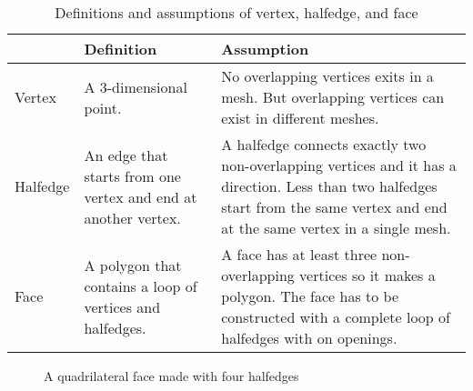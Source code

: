 \documentclass[12pt]{article}
\begin{document}
\begin{table}[ht]
\centering
\begin{tabular}{| l | p{} | p{}|}

\hline
		&	Definition	& Assumption	\\
\hline
Vertex	&	A 3-dimensional point.		&	No overlapping vertices 
exits in a mesh. But overlapping vertices can exist in different meshes.\\
\hline
Halfedge	&	An edge that starts from one vertex and end at another vertex. & 
A halfedge connects exactly two non-overlapping vertices and it has a direction. 
Less than two halfedges start from the same vertex and end at the same vertex in a 
single mesh.\\
\hline
Face		&	A polygon that contains a loop of vertices and halfedges.	& A face has at 
least three non-overlapping vertices so it makes a polygon. The face has to be constructed 
with a complete loop of halfedges with on openings.\\
\hline
\end{tabular}
\caption{Definitions and assumptions of vertex, halfedge, and face} 
\label{table:vhfdef}
\end{table}

\begin{figure}[ht]
  \centering
  \caption{A quadrilateral face made with four halfedges}
  \label{figure:singleFace}
\end{figure}
\end{document}
